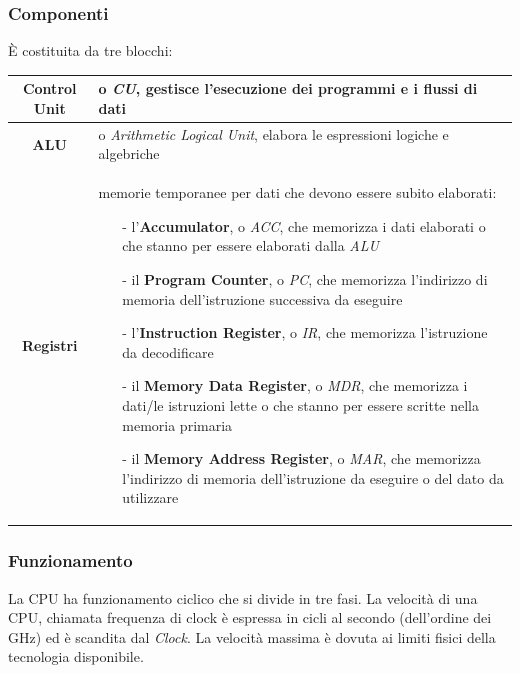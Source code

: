 \documentclass[a4paper]{article}
\begin{document}
\subsubsection*{Componenti}
È costituita da tre blocchi:
\begin{center}	
	\begin{tabularx}{\textwidth}{c X}
		\textbf{Control Unit} & o \textit{CU}, gestisce l'esecuzione dei programmi e i flussi di dati \\
		\midrule
		\textbf{ALU} & o \textit{Arithmetic Logical Unit}, elabora le espressioni logiche e algebriche \\
		\midrule
		\textbf{Registri} & memorie temporanee per dati che devono essere subito elaborati:
		\begin{itemize}[topsep=3pt, itemsep=0pt]
			\item[-] l'\textbf{Accumulator}, o \textit{ACC}, che memorizza i dati elaborati o che stanno per essere elaborati dalla \textit{ALU}
			\item[-] il \textbf{Program Counter}, o \textit{PC}, che memorizza l'indirizzo di memoria dell'istruzione successiva da eseguire
			\item[-] l'\textbf{Instruction Register}, o \textit{IR}, che memorizza l'istruzione da decodificare
			\item[-] il \textbf{Memory Data Register},	o \textit{MDR}, che memorizza i dati/le istruzioni lette o che stanno per essere scritte nella memoria primaria
			\item[-] il \textbf{Memory Address Register}, o \textit{MAR}, che memorizza l'indirizzo di memoria dell'istruzione da eseguire o del dato da utilizzare
		\end{itemize}
	\end{tabularx}
\end{center}

\subsubsection*{Funzionamento}
La CPU ha funzionamento ciclico che si divide in tre fasi. La velocità di una CPU, chiamata frequenza di clock è espressa
in cicli al secondo (dell'ordine dei GHz) ed è scandita dal \textit{Clock}. La velocità massima è dovuta ai limiti fisici
della tecnologia disponibile.
\end{document}
